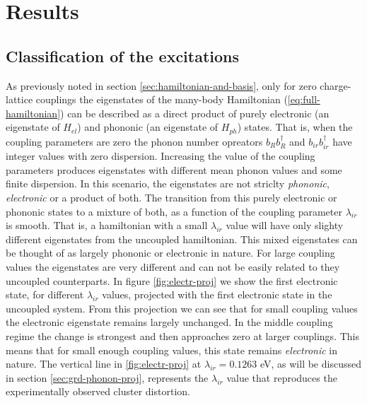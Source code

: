 \chapter{Results}
\label{chap:results}


\section{Classification of the excitations}
\label{sec:classification}

As previously noted in section \ref{sec:hamiltonian-and-basis}, only for zero charge-lattice couplings the eigenstates of the many-body Hamiltonian (\ref{eq:full-hamiltonian}) can be described as a direct product of purely electronic (an eigenstate of $H_{el}$) and phononic (an eigenstate of $H_{ph}$) states. 
That is, when the coupling parameters are zero the phonon number opreators $b_Rb^\dagger_R$ and $b_{ir}b^\dagger_{ir}$ have integer values with zero dispersion.
Increasing the value of the coupling parameters produces eigenstates with different mean phonon values and some finite dispersion.
In this scenario, the eigenstates are not striclty \textit{phononic}, \textit{electronic} or a product of both. 
The transition from this purely electronic or phononic states to a mixture of both, as a function of the coupling parameter $\lambda_{ir}$ is smooth.
That is, a hamiltonian with a small $\lambda_{ir}$ value will have only slighty different eigenstates from the uncoupled hamiltonian.
This mixed eigenstates can be thought of as largely phononic or electronic in nature.
For large coupling values the eigenstates are very different and can not be easily related to they uncoupled counterparts.
In figure \ref{fig:electr-proj} we show the first electronic state, for different $\lambda_{ir}$ values, projected with the first electronic state in the uncoupled system.
From this projection we can see that for small coupling values the electronic eigenstate remains largely unchanged.
In the middle coupling regime the change is strongest and then approaches zero at larger couplings.
This means that for small enough coupling values, this state remains \textit{electronic} in nature.
The vertical line in \ref{fig:electr-proj} at $\lambda_{ir}=0.1263$ eV, as will be discussed in section \ref{sec:grd-phonon-proj}, represents the $\lambda_{ir}$ value that reproduces the experimentally observed cluster distortion.
